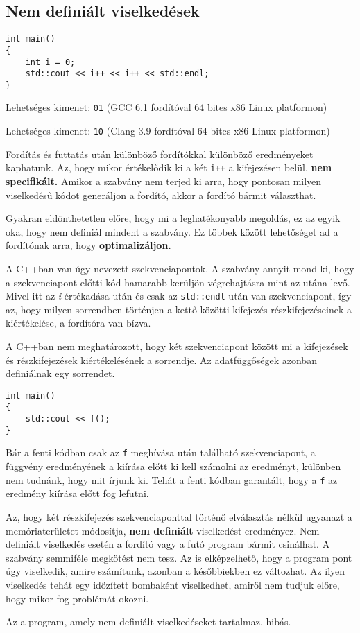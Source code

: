 \documentclass[a4paper,11.5pt,table]{article}
\begin{document}
	\subsection{Nem definiált viselkedések}
	\begin{lstlisting}
int main()
{
	int i = 0;
	std::cout << i++ << i++ << std::endl;
}
	\end{lstlisting}
	Lehetséges kimenet: \texttt{01} (GCC 6.1 fordítóval 64 bites x86 Linux platformon)
	
	Lehetséges kimenet: \texttt{10} (Clang 3.9 fordítóval 64 bites x86 Linux platformon)
	\medskip
	
	Fordítás és futtatás után különböző fordítókkal különböző eredményeket kaphatunk. Az, hogy mikor értékelődik ki a két \texttt{i++} a kifejezésen belül, \textbf{nem specifikált.} Amikor a szabvány nem terjed ki arra, hogy pontosan milyen viselkedésű kódot generáljon a fordító, akkor a fordító bármit választhat. 
	\medskip
	
	Gyakran eldönthetetlen előre, hogy mi a leghatékonyabb megoldás, ez az egyik oka, hogy nem definiál mindent a szabvány.
	Ez többek között lehetőséget ad a fordítónak arra, hogy \textbf{optimalizáljon.} 
	\medskip
	
	A C++ban van úgy nevezett szekvenciapontok. A szabvány annyit mond ki, hogy a szekvenciapont előtti kód hamarabb kerüljön végrehajtásra mint az utána levő. Mivel itt az \textit{i} értékadása után és csak az \texttt{std::endl} után van szekvenciapont, így az, hogy milyen sorrendben történjen a kettő közötti kifejezés részkifejezéseinek a kiértékelése, a fordítóra van bízva.
	\medskip
	
	A C++ban nem meghatározott, hogy két szekvenciapont között mi a kifejezések és részkifejezések kiértékelésének a sorrendje. Az adatfüggőségek azonban definiálnak egy sorrendet.

	\begin{lstlisting}
int main()
{
	std::cout << f();
}
	\end{lstlisting}

	Bár a fenti kódban csak az \texttt{f} meghívása után található szekvenciapont, a függvény eredményének a kiírása előtt ki kell számolni az eredményt, különben nem tudnánk, hogy mit írjunk ki. Tehát a fenti kódban garantált, hogy a \texttt{f} az eredmény kiírása előtt fog lefutni.

	\medskip
	Az, hogy két részkifejezés szekvenciaponttal történő elválasztás nélkül ugyanazt a memóriaterületet módosítja, \textbf{nem definiált} viselkedést eredményez. Nem definiált viselkedés esetén a fordító vagy a futó program bármit csinálhat. A szabvány semmiféle megkötést nem tesz. Az is elképzelhető, hogy a program pont úgy viselkedik, amire számítunk, azonban a későbbiekben ez változhat. Az ilyen viselkedés tehát egy időzített bombaként viselkedhet, amiről nem tudjuk előre, hogy mikor fog problémát okozni.
	\begin{note}
		Az a program, amely nem definiált viselkedéseket tartalmaz, hibás.
	\end{note}
\end{document}
